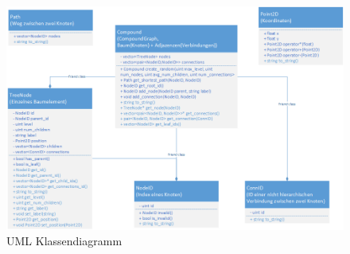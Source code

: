 \documentclass[11pt]{beamer}
\begin{document}
\begin{frame}[allowframebreaks]
\begin{figure}
\centering
\includegraphics[width=0.9\linewidth]{./UML_tree}
\caption[UML Klassen]{UML Klassendiagramm}
\label{fig:UML_tree}
\end{figure}

\end{frame}
\end{document}

